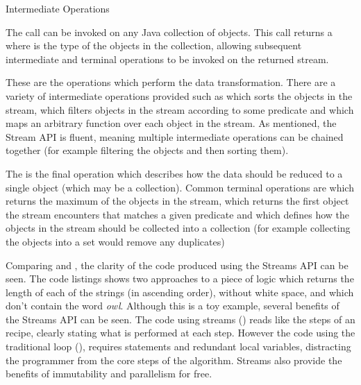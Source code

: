 \begin{labeling}{Intermediate Operations}
	\item [Initial stream call] The  call can be invoked on any Java collection of objects. This call returns a  where  is the type of the objects in the collection, allowing subsequent intermediate and terminal operations to be invoked on the returned stream.
	\item [Intermediate Operations] These are the operations which perform the data transformation. There are a variety of intermediate operations provided such as  which sorts the objects in the stream,  which filters objects in the stream according to some predicate and  which maps an arbitrary function over each object in the stream. As mentioned, the Stream API is fluent, meaning multiple intermediate operations can be chained together (for example filtering the objects and then sorting them).
	\item [Terminal Operations] The is the final operation which describes how the data should be reduced to a single object (which may be a collection). Common terminal operations are  which returns the maximum of the objects in the stream,  which returns the first object the stream encounters that matches a given predicate and  which defines how the objects in the stream should be collected into a collection (for example collecting the objects into a set would remove any duplicates)
\end{labeling}

Comparing  and , the clarity of the code produced using the Streams API can be seen. The code listings shows two approaches to a piece of logic which returns the length of each of the strings (in ascending order), without white space, and which don't contain the word \textit{owl}. Although this is a toy example, several benefits of the Streams API can be seen. The code using streams () reads like the steps of an recipe, clearly stating what is performed at each step. However the code using the traditional  loop (), requires  statements and redundant local variables, distracting the programmer from the core steps of the algorithm. Streams also provide the benefits of immutability and parallelism for free.



